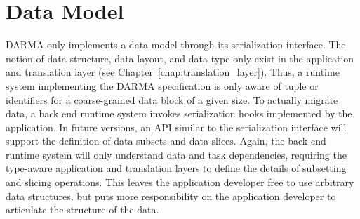 
\section{Data Model}
\label{sec:data_model}
\gls{DARMA} only implements a \gls{data model} through its \gls{serialization} interface.
The notion of data structure, data layout, and data type only exist in the
application and \gls{translation layer} (see
    Chapter~\ref{chap:translation_layer}).
Thus, a \gls{runtime system} implementing the \gls{DARMA} specification is only
aware of \gls{tuple} or  identifiers for a coarse-grained data block of a given size.
To actually migrate data, a \gls{back end} \gls{runtime system} invokes
\gls{serialization} hooks implemented by the application.
In future versions, an \gls{API} similar to the \gls{serialization} interface will support the definition of data subsets and data slices.
Again, the \gls{back end} \gls{runtime system} will only understand data and task dependencies,
  requiring the type-aware application and \glspl{translation layer} to define
  the details of subsetting and slicing operations.
This leaves the application developer free to use arbitrary data structures,
     but puts more responsibility on the application developer to articulate
     the structure of the data.


